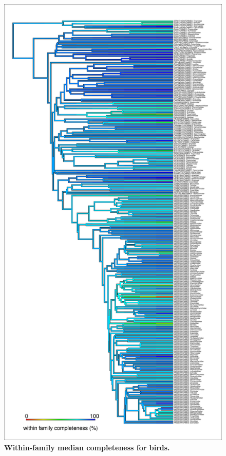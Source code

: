 \documentclass[11pt]{article}
\begin{document}
\begin{figure}[h!]
\centering
\includegraphics[scale=0.45]{figures/NA_phylo_patterns/Birds_completeness}
\caption[Within-family median completeness for birds]{\textbf{Within-family median completeness for birds.}}
\label{}
\end{figure}
\end{document}

